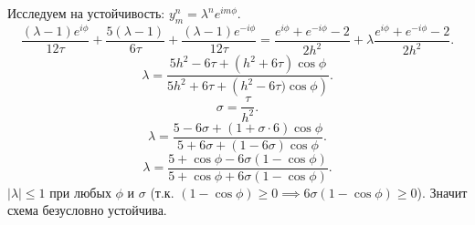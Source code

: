 \documentclass[a4paper]{article}
\begin{document}
\begin{sol}
Исследуем на устойчивость: $y_{m}^n= \lambda^n e^{i m \phi}$.
\[
	\frac{\left( \lambda-1 \right) e^{i\phi}}{12\tau}+
	\frac{5 \left( \lambda-1 \right) }{6\tau}+
	\frac{(\lambda-1)e^{-i\phi}}{12\tau}=
	\frac{e^{i\phi}+ e^{-i\phi}-2}{2h^2}+
	\lambda \frac{e^{i\phi}+e^{-i\phi}-2}{2h^2}
.\] 
\[
	\lambda= \frac{5h^2 -6\tau +\left( h^2 +6\tau \right) 
	\cos \phi }{5h^2 +6\tau+\left( h^2-6\tau)
\cos  \phi\right) }
.\]
\[
\sigma= \frac{\tau}{h^2}
.\] 
\[
	\lambda= \frac{5-6 \sigma +\left( 1+ \sigma\cdot 6 \right) \cos  \phi}{5 + 6 \sigma + \left( 1- 6\sigma \right) 
	\cos \phi}
.\] 
\[
	\lambda= \frac{5 + \cos \phi - 6 \sigma \left( 1- \cos \phi \right) }{5 + \cos \phi + 6 \sigma (1- \cos \phi)}
.\] 
$|\lambda|\le 1$ при любых $\phi$ и $\sigma$ (т.\:к.
$(1-\cos \phi)\ge 0\implies 6 \sigma (1-\cos \phi)\ge 0$).
Значит схема безусловно устойчива.
\end{sol}
\end{document}

